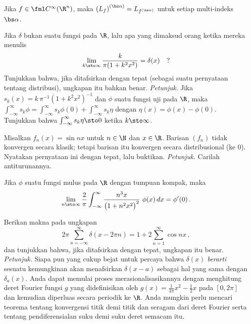 \begin{prop} Jika $f \in \fml C^\infty(\R^n)$, maka $\left(L_f\right)^{(\bs\alpha)} = L_{f^{(\bs\alpha)}}$ untuk setiap multi-indeks $\bs\alpha$.
\end{prop}

\begin{exer} Jika $\delta$ bukan suatu fungsi pada $\R$, lalu apa yang dimaksud orang ketika mereka menulis
   \[ \lim_{k \sto \infty} \frac{k}{\pi(1+k^2x^2)} = \delta(x)\quad? \]
Tunjukkan bahwa, jika ditafsirkan dengan tepat (sebagai suatu pernyataan tentang distribusi), ungkapan itu bahkan benar. \emph{Petunjuk.}
Jika $s_k(x) = k\,\pi^{-1}(1+k^2x^2)^{-1}$ dan $\phi$ suatu fungsi uji pada $\R$, maka
$\int_{-\infty}^\infty s_k\phi = \int_{-\infty}^\infty s_k\phi(0) + \int_{-\infty}^\infty s_k\eta$ dengan $\eta(x) = \phi(x) - \phi(0)$.
Tunjukkan bahwa $\int_{-\infty}^\infty s_k\eta \sto 0$ ketika $k \sto \infty$.
\end{exer}

\begin{exer} Misalkan $f_n(x) = \sin nx$ untuk $n \in \N$ dan $x \in \R$. Barisan $(f_n)$ tidak konvergen secara klasik;
tetapi barisan itu konvergen secara distribusional (ke $0$). Nyatakan pernyataan ini dengan tepat, lalu buktikan. \emph{Petunjuk.} Carilah antiturunannya.
\end{exer}

\begin{prop} Jika $\phi$ suatu fungsi mulus pada $\R$ dengan tumpuan kompak, maka
    \[ \lim_{n \sto \infty}\frac2\pi \int_{-\infty}^\infty \frac{n^3x}{\bigl(1 + n^2x^2\bigr)^2}\,\, \phi(x)\,dx = \phi'(0)\,.\]
\end{prop}

\begin{exer} Berikan makna pada ungkapan
   \[ 2\pi\sum_{n = -\infty}^\infty \delta(x-2\pi n) =  1 +  2\sum_{n = 1}^\infty \cos nx\,, \]
dan tunjukkan bahwa, jika ditafsirkan dengan tepat, ungkapan itu benar. \emph{Petunjuk.} Siapa pun yang cukup bejat untuk percaya bahwa $\delta(x)$ \emph{berarti}
sesuatu kemungkinan akan menafsirkan $\delta(x-a)$ sebagai hal yang sama dengan $\delta_a(x)$. Anda dapat memulai proses
merasionalisasikannya dengan menghitung deret Fourier fungsi $g$ yang didefinisikan oleh $g(x) = \frac1{4\pi}x^2 - \frac12 x$ pada $[0,2\pi]$
dan kemudian diperluas secara periodik ke $\R$. Anda mungkin perlu mencari teorema tentang konvergensi titik demi titik dan seragam dari deret Fourier
serta tentang pendiferensialan suku demi suku deret semacam itu.
\end{exer}

